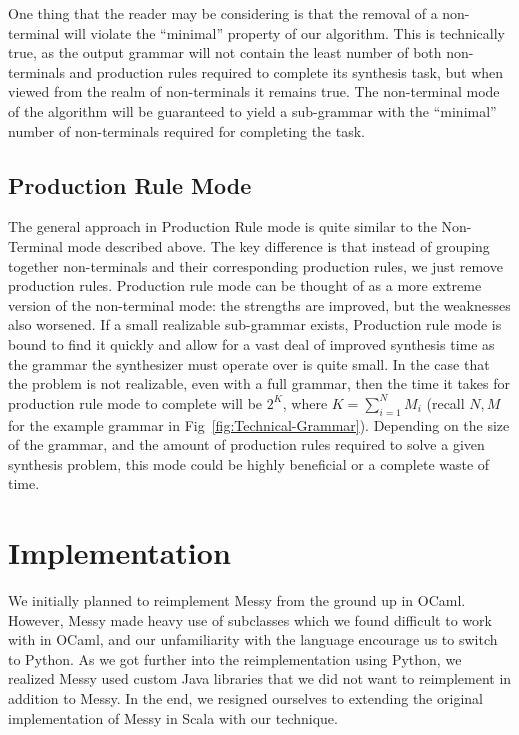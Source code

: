\documentclass[acmsmall, nonacm]{acmart}
\begin{document}
One thing that the reader may be considering is that the removal of a non-terminal will violate the ``minimal'' property of our algorithm. This is technically true, as the output grammar will not contain the least number of both non-terminals and production rules required to complete its synthesis task, but when viewed from the realm of non-terminals it remains true. The non-terminal mode of the algorithm will be guaranteed to yield a sub-grammar with the ``minimal'' number of non-terminals required for completing the task.

\subsection{Production Rule Mode}
The general approach in Production Rule mode is quite similar to the Non-Terminal mode described above. The key difference is that instead of grouping together non-terminals and their corresponding production rules, we just remove production rules. Production rule mode can be thought of as a more extreme version of the non-terminal mode: the strengths are improved, but the weaknesses also worsened.
If a small realizable sub-grammar exists, Production rule mode is bound to find it quickly and allow for a vast deal of improved synthesis time as the grammar the synthesizer must operate over is quite small. In the case that the problem is not realizable, even with a full grammar, then the time it takes for production rule mode to complete will be $2^K$, where $K = \sum_{i = 1}^{N} M_i$ (recall $N,M$ for the example grammar in Fig~\ref{fig:Technical-Grammar}).
Depending on the size of the grammar, and the amount of production rules required
to solve a given synthesis problem, this mode could be highly beneficial or a complete waste of time.

\section{Implementation}
We initially planned to reimplement Messy from the ground up in OCaml. However, Messy made heavy use of subclasses which we found difficult to work with in OCaml, and our unfamiliarity with the language encourage us to switch to Python. As we got further into the reimplementation using Python, we realized Messy used custom Java libraries that we did not want to reimplement in addition to Messy. In the end, we resigned ourselves to extending the original implementation of Messy in Scala with our technique.
\end{document}
